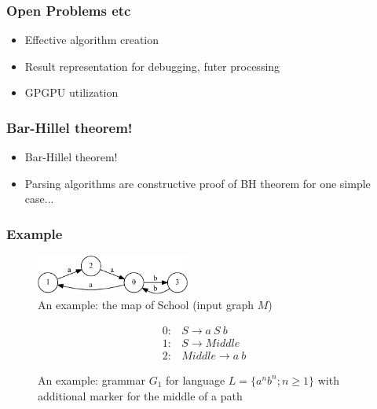 \documentclass{beamer}
\begin{document}
\begin{frame}
  \transwipe[direction=90]
  \frametitle{Open Problems etc}
  \begin{itemize}
    \item Effective algorithm creation
    \item Result representation for debugging, futer processing 
    \item GPGPU utilization
  \end{itemize}
\end{frame}

\begin{frame}
  \transwipe[direction=90]
  \frametitle{Bar-Hillel theorem!}
  \begin{itemize}
    \item Bar-Hillel theorem!
    \item Parsing algorithms are constructive proof of BH theorem for one simple case...
  \end{itemize}
\end{frame}

\begin{frame}
  \transwipe[direction=90]
  \frametitle{Example}
\begin{figure}[ht]
    \centering
        \includegraphics[width=0.45\textwidth]{pictures/input.pdf}
        \caption{An example: the map of School (input graph $M$)}
\end{figure}
\begin{figure}[ht]
\centering
   \[
\begin{array}{rl} 
   0:& S \rightarrow a \ S \ b \\
   1:& S \rightarrow Middle \\
   2:& Middle \rightarrow a \ b
\end{array}
\]
   \caption{An example: grammar $G_1$ for language $L=\{a^n b^n; n \geq 1\}$ with additional marker for the middle of a path}
   \label{grammarG}        
    \end{figure}
\end{frame}
\end{document}
